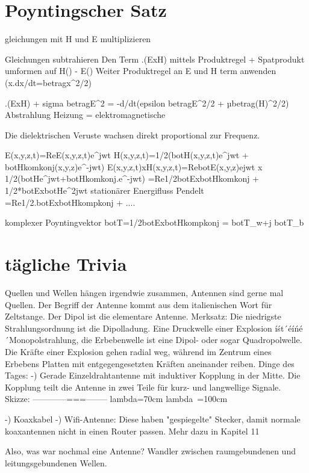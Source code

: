 \documentclass[a4paper]{article}
\begin{document}
\section{Poyntingscher Satz}
gleichungen mit H und E multiplizieren

Gleichungen subtrahieren
Den Term \nabla.(ExH) mittels Produktregel + Spatprodukt umformen auf H(\nablaxE) - E(\nablaxH)
Weiter Produktregel an E und H term anwenden (x.dx/dt=betragx^2/2)

\nabla.(ExH) + sigma betragE^2 = -d/dt(epsilon betragE^2/2 + µbetrag(H)^2/2)
Abstrahlung   Heizung         =          elektromagnetische


Die dielektrischen Veruste wachsen direkt proportional zur Frequenz.

E(x,y,z,t)=Re{E(x,y,z,t)e^jwt}
H(x,y,z,t)=1/2(botH(x,y,z,t)e^jwt + botHkomkonj(x,y,z)e^-jwt)
E(x,y,z,t)xH(x,y,z,t)=Re{botE(x,y,z)ejwt} x 1/2(botHe^jwt+botHkomkonj.e^-jwt)
                    =Re{1/2botExbotHkomkonj + 1/2*botExbotHe^2jwt}
                    stationärer Energifluss        Pendelt
                    =Re{1/2.botExbotHkompkonj} + ....

    komplexer Poyntingvektor botT=1/2botExbotHkompkonj = botT_w+j botT_b


\section{tägliche Trivia}
Quellen und Wellen hängen irgendwie zusammen, Antennen sind gerne mal Quellen.
Der Begriff der Antenne kommt aus dem italienischen Wort für Zeltstange.
Der Dipol ist die elementare Antenne.
Merksatz: Die niedrigste Strahlungsordnung ist die Dipolladung.
Eine Druckwelle einer Explosion íśt´éíńé´Monopolstrahlung, die Erbebenwelle ist
eine Dipol- oder sogar Quadropolwelle.
Die Kräfte einer Explosion gehen radial weg, während im Zentrum eines Erbebens
Platten mit entgegengesetzten Kräften aneinander reiben.
Dinge des Tages:
-) Gerade Einzeldrahtantenne mit induktiver Kopplung in der Mitte. Die Kopplung teilt die Antenne in zwei Teile für kurz- und langwellige Signale.
       Skizze: ------------===--------
                lambda=70cm   lambda~=100cm

-) Koaxkabel
-) Wifi-Antenne: Diese haben "gespiegelte" Stecker, damit normale koaxantennen 
    nicht in einen Router passen. Mehr dazu in Kapitel 11

Also, was war nochmal eine Antenne? Wandler zwischen raumgebundenen und
                                    leitungsgebundenen Wellen.
\end{document}
